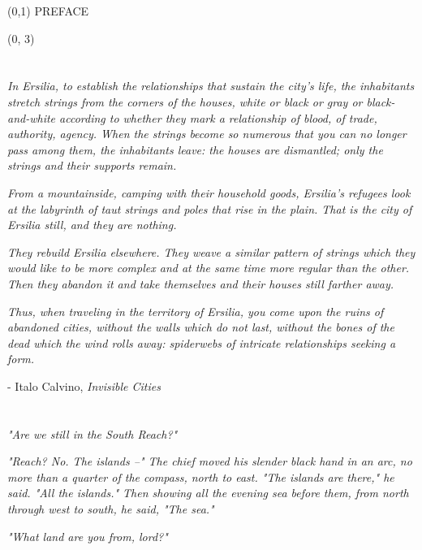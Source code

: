 \documentclass[10pt]{article}
\begin{document}
\begin{textblock}{23}(0,1)
\center\huge PREFACE
\end{textblock}

\begin{textblock}{11}(0, 3)

\section{}

\textit{In Ersilia, to establish the relationships that sustain the city's
life, the inhabitants stretch strings from the corners of the houses, white or
black or gray or black-and-white according to whether they mark a relationship
of blood, of trade, authority, agency. When the strings become so numerous that
you can no longer pass among them, the inhabitants leave: the houses are
dismantled; only the strings and their supports remain.}

\textit{From a mountainside, camping with their household goods, Ersilia's
refugees look at the labyrinth of taut strings and poles that rise in the
plain. That is the city of Ersilia still, and they are nothing.}

\textit{They rebuild Ersilia elsewhere. They weave a similar pattern of strings
which they would like to be more complex and at the same time more regular than
the other. Then they abandon it and take themselves and their houses still
farther away.}

\textit{Thus, when traveling in the territory of Ersilia, you come upon the
ruins of abandoned cities, without the walls which do not last, without the
bones of the dead which the wind rolls away: spiderwebs of intricate
relationships seeking a form.}

- Italo Calvino, \emph{Invisible Cities}

\section{}

\textit{"Are we still in the South Reach?"}

\textit{"Reach? No. The islands --" The chief moved his slender black hand in
an arc, no more than a quarter of the compass, north to east. "The islands are
there," he said. "All the islands." Then showing all the evening sea before
them, from north through west to south, he said, "The sea."}

\textit{"What land are you from, lord?"}


\end{textblock}
\end{document}
